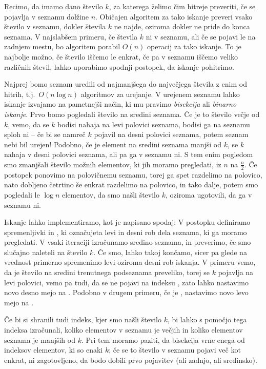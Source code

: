 
Recimo, da imamo dano število $k$, za katerega želimo čim hitreje preveriti, če
se pojavlja v seznamu  dolžine $n$.
Običajen algoritem za tako iskanje preveri vsako število v seznamu, dokler
števila $k$ ne najde, oziroma dokler ne pride do konca seznama.
V najslabšem primeru, če števila $k$ ni v seznamu, ali če se pojavi le na
zadnjem mestu, bo algoritem porabil $O(n)$ operacij za tako iskanje.
To je najbolje možno, če število iščemo le enkrat, če pa v seznamu iščemo veliko
različnih števil, lahko uporabimo spodnji postopek, da iskanje pohitrimo.

Najprej bomo seznam uredili od najmanjšega do največjega števila z enim od
hitrih, t.j.~$O(n \log n)$ algoritmov za urejanje.
V urejenem seznamu lahko iskanje izvajamo na pametnejši način, ki mu pravimo
\emph{bisekcija} ali \emph{binarno iskanje}.
Prvo bomo pogledali število na sredini seznama.
Če je to število večje od $k$, vemo, da se $k$ bodisi nahaja na levi
polovici seznama, bodisi ga na seznamu sploh ni -- če bi se namreč $k$ pojavil
na desni polovici seznama, potem seznam nebi bil urejen!
Podobno, če je element na sredini seznama manjši od $k$, se $k$ nahaja
v desni polovici seznama, ali pa ga v seznamu ni.
S tem enim pogledom smo zmanjšali število možnih elementov, ki jih moramo
pregledati, iz $n$ na $\frac{n}{2}$.
Če postopek ponovimo na polovičnemu seznamu, torej ga spet razdelimo na
polovico, nato dobljeno četrtino še enkrat razdelimo na polovico, in tako dalje,
potem smo pogledali le $\log n$ elementov, da smo našli število $k$, oziroma
ugotovili, da ga v seznamu ni.

Iskanje lahko implementiramo, kot je napisano spodaj:
V postopku definiramo spremenljivki  in , ki označujeta
levi in desni rob dela seznama, ki ga moramo pregledati.
V vsaki iteraciji izračunamo sredino seznama, in preverimo, če smo slučajno
naleteli na število $k$.
Če smo, lahko takoj končamo, sicer pa glede na vrednost 
primerno spremenimo levi oziroma desni rob iskanja.
V primeru  vemo, da je število na sredini trenutnega
podseznama preveliko, torej se $k$ pojavlja na levi polovici, vemo pa tudi, da
se ne pojavi na indeksu , zato lahko nastavimo novo desno mejo na
.
Podobno v drugem primeru, če je , nastavimo novo levo
mejo na .

Če bi si shranili tudi indeks, kjer smo našli število $k$, bi lahko s pomočjo
tega indeksa izračunali, koliko elementov v seznamu je večjih in koliko
elementov seznama je manjših od $k$.
Pri tem moramo paziti, da bisekcija vrne enega od indeksov elementov, ki so
enaki $k$; če se to število v seznamu pojavi več kot enkrat, ni
zagotovljeno, da bodo dobili prvo pojavitev (ali zadnjo, ali sredinsko).

